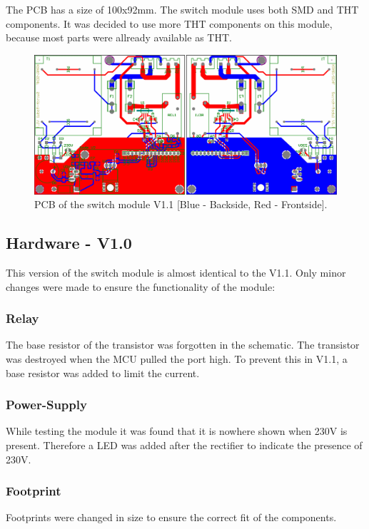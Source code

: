         The PCB has a size of 100x92mm. The switch module uses both SMD and THT components. It was decided to use more THT 
        components on this module, because most parts were allready available as THT.

        \begin{figure}[H]
            \centering
            \includegraphics[width=1.1\textwidth]{assets/HW/PCB-SWITCH-V1.1.png}
            \caption{PCB of the switch module V1.1 [Blue - Backside, Red - Frontside].}
        \end{figure}


\subsection{Hardware - V1.0}

    This version of the switch module is almost identical to the V1.1. Only minor changes were made
    to ensure the functionality of the module:

    \subsubsection{Relay}
    The base resistor of the transistor was forgotten in the schematic. The transistor was destroyed
    when the MCU pulled the port high. To prevent this in V1.1, a base resistor was added to limit 
    the current.

    \subsubsection{Power-Supply}
    While testing the module it was found that it is nowhere shown when 230V is present. Therefore
    a LED was added after the rectifier to indicate the presence of 230V.

    \subsubsection{Footprint}
    Footprints were changed in size to ensure the correct fit of the components.

